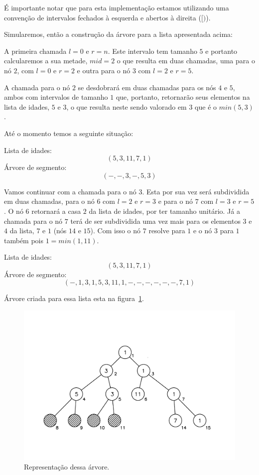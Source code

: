 É importante notar que para esta implementação estamos utilizando uma convenção de intervalos fechados à esquerda e abertos à direita ($[)$).

Simularemos, então a construção da árvore para a lista apresentada acima:
 
A primeira chamada $l = 0$ e $r = n$.
Este intervalo tem tamanho $5$ e portanto calcularemos a sua metade, $mid = 2$ o que resulta em duas chamadas, uma para o nó $2$, com $l = 0$ e $r = 2$ e outra para o nó $3$ com $l = 2$ e $r = 5$.

A chamada para o nó $2$ se desdobrará em duas chamadas para os nós $4$ e $5$, ambos com intervalos de tamanho $1$ que, portanto, retornarão seus elementos na lista de idades, $5$ e $3$, o que resulta neste sendo valorado em $3$ que é o $min(5, 3)$.

Até o momento temos a seguinte situação:

Lista de idades: $$(5, 3, 11, 7, 1)$$
Árvore de segmento: $$(-, -, 3, -, 5, 3)$$

Vamos continuar com a chamada para o nó $3$. Esta por sua vez será subdividida em duas chamadas, para o nó $6$ com $l = 2$ e $r = 3$ e para o nó $7$ com $l = 3$ e $r = 5$. O nó $6$ retornará a casa $2$ da lista de idades, por ter tamanho unitário. Já a chamada para o nó $7$ terá de ser subdividida uma vez mais para os elementos $3$ e $4$ da lista, $7$ e $1$ (nós $14$ e $15$). Com isso o nó $7$ resolve para $1$ e o nó $3$ para $1$ também pois $1 = min(1, 11)$.

Lista de idades: $$(5, 3, 11, 7, 1)$$
Árvore de segmento: $$(-, 1, 3, 1, 5, 3, 11, 1, -, -, -, -, -, -, 7, 1)$$

Árvore criada para essa lista esta na figura~\ref{fig:fig2}.
\begin{figure}[htb]
\includegraphics[width=18cm]{figuras/fig2.pdf}
\caption{\label{fig:fig2}Representação dessa árvore.}
\end{figure}


